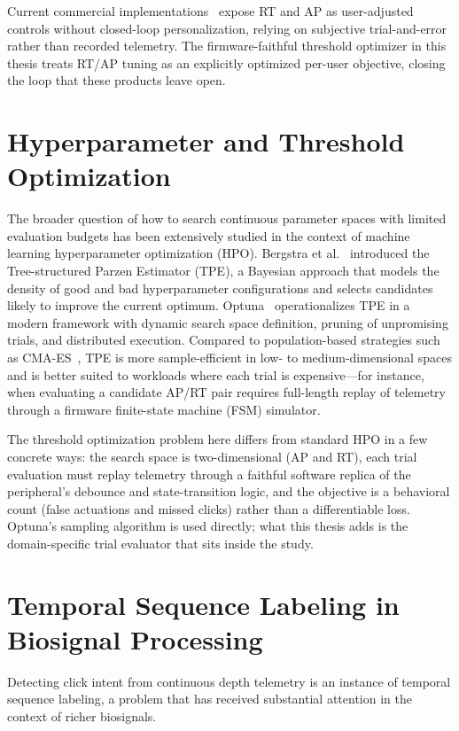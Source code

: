 Current commercial implementations~\cite{wooting_rapid_trigger, logitech_superstrike_2026} expose RT and AP as user-adjusted controls without closed-loop personalization, relying on subjective trial-and-error rather than recorded telemetry. The firmware-faithful threshold optimizer in this thesis treats RT/AP tuning as an explicitly optimized per-user objective, closing the loop that these products leave open.

\section{Hyperparameter and Threshold Optimization}

The broader question of how to search continuous parameter spaces with limited evaluation budgets has been extensively studied in the context of machine learning hyperparameter optimization (HPO). Bergstra et al.~\cite{bergstra_tpe_2011} introduced the Tree-structured Parzen Estimator (TPE), a Bayesian approach that models the density of good and bad hyperparameter configurations and selects candidates likely to improve the current optimum. Optuna~\cite{optuna_akiba_2019} operationalizes TPE in a modern framework with dynamic search space definition, pruning of unpromising trials, and distributed execution. Compared to population-based strategies such as CMA-ES~\cite{hansen_cma_2016}, TPE is more sample-efficient in low- to medium-dimensional spaces and is better suited to workloads where each trial is expensive---for instance, when evaluating a candidate AP/RT pair requires full-length replay of telemetry through a firmware finite-state machine (FSM) simulator.

The threshold optimization problem here differs from standard HPO in a few concrete ways: the search space is two-dimensional (AP and RT), each trial evaluation must replay telemetry through a faithful software replica of the peripheral's debounce and state-transition logic, and the objective is a behavioral count (false actuations and missed clicks) rather than a differentiable loss. Optuna's sampling algorithm is used directly; what this thesis adds is the domain-specific trial evaluator that sits inside the study.

\section{Temporal Sequence Labeling in Biosignal Processing}

Detecting click intent from continuous depth telemetry is an instance of temporal sequence labeling, a problem that has received substantial attention in the context of richer biosignals.

